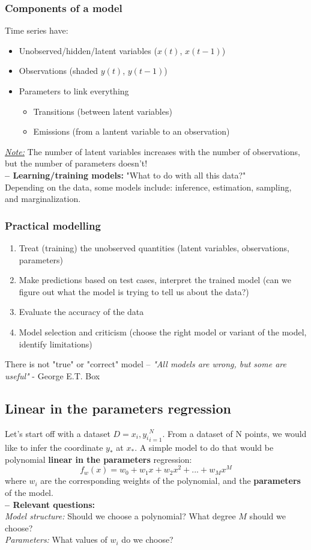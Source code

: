 \documentclass[a4paper,11pt]{article}
\begin{document}
	\subsubsection{Components of a model}
	Time series have: 
	\begin{itemize}
		\item Unobserved/hidden/latent variables ($x(t)$, $x(t-1)$)
		\item Observations (shaded $y(t)$, $y(t-1)$)
		\item Parameters to link everything 
		\begin{itemize}
			\item Transitions (between latent variables)
			\item Emissions (from a lantent variable to an observation)
		\end{itemize}
	\end{itemize}
	\underline{\emph{Note:}} The number of latent variables increases with the number of observations, but the number of parameters doesn't!\\
	\textbf{-- Learning/training models:} "What to do with all this data?"\\ Depending on the data, some models include: inference, estimation, sampling, and marginalization.
	\subsubsection{Practical modelling}
	\begin{enumerate}
		\item Treat (training) the unobserved quantities (latent variables, observations, parameters)
		\item Make predictions based on test cases, interpret the trained model (can we figure out what the model is trying to tell us about the data?)
		\item Evaluate the accuracy of the data
		\item Model selection and criticism (choose the right model or variant of the model, identify limitations)
	\end{enumerate}
	There is not "true" or "correct" model -- \emph{"All models are wrong, but some are useful"} - George E.T. Box
	\subsection{Linear in the parameters regression}
	Let's start off with a dataset $D={x_i,y_i}^N_{i=1}$. From a dataset of N points, we would like to infer the coordinate $y_*$ at $x_*$. A simple model to do that would be polynomial \textbf{linear in the parameters} regression:
	\[f_w(x)=w_0+w_1 x+w_2 x^2+...+w_M x^M\]
	where $w_i$ are the corresponding weights of the polynomial, and the \textbf{parameters} of the model.
	\vspace{5pt}\\
	\textbf{-- Relevant questions:}
	\vspace{5pt}\\
	\emph{Model structure:} Should we choose a polynomial? What degree $M$ should we choose?\\
	\emph{Parameters:} What values of $w_i$ do we choose?
\end{document}
